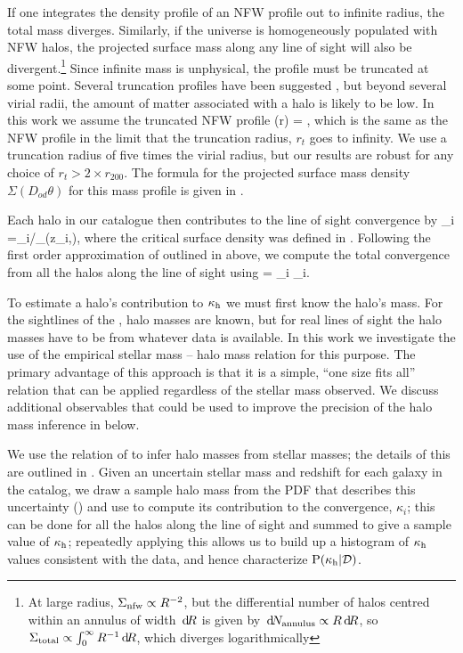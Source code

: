 \documentclass[useAMS,usenatbib]{mn2e}
\begin{document}
If one integrates the density profile of an NFW profile out to infinite
radius, the total mass diverges. Similarly, if the universe is
homogeneously populated with NFW halos, the projected surface mass along
any line of sight will also be divergent.\footnote{At large radius,
$\Sigma_{\rm nfw} \propto R^{-2}$, but the differential number of halos
centred within an annulus of width $\, \mathrm{d} \! R$ is given by $\, \mathrm{d} \! N_{\rm
annulus} \propto R \, \mathrm{d} \! R$, so  $\Sigma_{\rm total} \propto
\int_{0}^{\infty} R^{-1} \, \mathrm{d} \! R$, which diverges logarithmically} Since
infinite mass is unphysical, the profile must be truncated at some
point. Several truncation profiles have been suggested
\citep[e.g][]{BMO}, but beyond several virial radii, the amount of
matter associated with a halo is likely to be low. In this work we
assume the truncated NFW profile
\be\label{eq:bmoprofile}
\rho(r) = 
,
\ee
which is the same as the NFW profile in the limit that the truncation
radius, $r_t$ goes to infinity. We use a truncation radius of five times
the virial radius, but our results are robust for any choice of $r_t>2
\times r_{200}$. The formula for the projected surface mass density 
$\Sigma(D_{od}\theta)$ for this
mass profile is given in \citet{BMO}. 

Each halo in our catalogue then contributes to
the line of sight convergence by
\be
\label{eq:kappai}
\kappa_i =\Sigma_{i}/\Sigma_{}(z_i,\zs),
\ee
where the critical surface density was defined in .
Following the first order approximation of \citet{HilbertEtal2009}
outlined in  above, we compute 
the total convergence from all the halos along the line
of sight using
\be 
\label{eq:kappasummu}
\kappah = \sum_{i} \kappa_i.
\ee

To estimate a halo's contribution to $\kappa_{\rm h}$ we must first know the
halo's mass. For the sightlines of the \MS, halo masses are
known, but for  real lines of sight the halo masses have to be \infered
from whatever data is available. 
In this work we investigate the use of the empirical stellar mass --
halo mass relation for this purpose. The primary advantage of this
approach is that it is a simple, ``one size fits all'' relation that can
be applied regardless of the stellar mass observed. We discuss
additional observables that could be used to improve the precision of
the halo mass inference in  below. 

We use the relation of \citet{BehrooziEtal2010} to infer halo masses
from stellar masses; the details of this \proceedure are outlined in 
. Given an uncertain stellar mass and redshift for
each galaxy in the  catalog, we draw a sample halo mass from the PDF
that describes this uncertainty  ()  and use
 to compute its contribution to the convergence,
$\kappa_i$; this can be done for all the halos along the line of sight
and summed to give a sample value of $\kappa_{\rm h}$;  repeatedly applying
this \proceedure allows us to build up a histogram of $\kappa_{\rm h}$ values
consistent with the data, and hence characterize ${\rm P}(\kappa_{\rm h}|{\mathcal{D}})$. 
\end{document}
